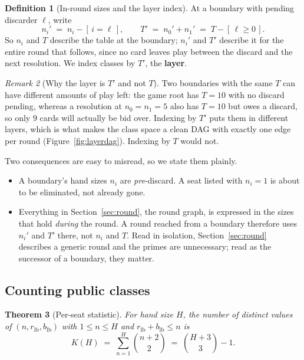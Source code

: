 \documentclass[11pt]{article}
\theoremstyle{plain}
\newtheorem{theorem}{Theorem}[section]
\theoremstyle{definition}
\newtheorem{definition}[theorem]{Definition}
\theoremstyle{remark}
\newtheorem{remark}[theorem]{Remark}
\newcommand{\rlb}{\ensuremath{r_{\mathrm{lb}}}}
\newcommand{\blb}{\ensuremath{b_{\mathrm{lb}}}}
\begin{document}
\begin{definition}[In-round sizes and the layer index]\label{def:layer}
At a boundary with pending discarder $\ell$, write
\[
  n_i' \;=\; n_i - [\,i=\ell\,],
  \qquad
  T' \;=\; n_0'+n_1' \;=\; T - [\,\ell\ge 0\,].
\]
So $n_i$ and $T$ describe the table at the boundary; $n_i'$ and $T'$
describe it for the entire round that follows, since no card leaves play
between the discard and the next resolution. We index classes by $T'$, the
\textbf{layer}.
\end{definition}

\begin{remark}[Why the layer is $T'$ and not $T$]
Two boundaries with the same $T$ can have different amounts of play left:
the game root has $T=10$ with no discard pending, whereas a resolution at
$n_0=n_1=5$ also has $T=10$ but owes a discard, so only $9$ cards will
actually be bid over. Indexing by $T'$ puts them in different layers, which
is what makes the class space a clean DAG with exactly one edge per round
(Figure~\ref{fig:layerdag}). Indexing by $T$ would not.
\end{remark}

Two consequences are easy to misread, so we state them plainly.

\begin{itemize}\itemsep2pt
  \item A boundary's hand sizes $n_i$ are \emph{pre}-discard. A seat listed
        with $n_i=1$ is about to be eliminated, not already gone.
  \item Everything in Section~\ref{sec:round}, the round graph, is
        expressed in the sizes that hold \emph{during} the round. A round
        reached from a boundary therefore uses $n_i'$ and $T'$ there, not
        $n_i$ and $T$. Read in isolation, Section~\ref{sec:round} describes
        a generic round and the primes are unnecessary; read as the
        successor of a boundary, they matter.
\end{itemize}

\subsection{Counting public classes}

\begin{theorem}[Per-seat statistic]\label{thm:seatcount}
For hand size $H$, the number of distinct values of
$(n,\rlb,\blb)$ with $1\le n\le H$ and $\rlb+\blb\le n$ is
\[
  K(H)\;=\;\sum_{n=1}^{H}\binom{n+2}{2}\;=\;\binom{H+3}{3}-1 .
\]
\end{theorem}
\end{document}
